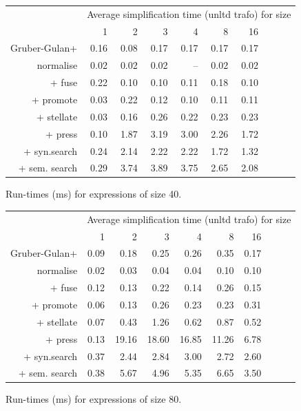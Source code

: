 \begin{figure}\begin{tabular}{rrrrrrrrrr}
 & \multicolumn{9}{c}{Average simplification time (unltd trafo) for size} \\
 & 1 & 2 & 3 & 4 & 8 & 16 \\
Gruber-Gulan+ & 0.16 & 0.08 & 0.17 & 0.17 & 0.17 & 0.17 \\
normalise & 0.02 & 0.02 & 0.02 & -- & 0.02 & 0.02 \\
+ fuse & 0.22 & 0.10 & 0.10 & 0.11 & 0.18 & 0.10 \\
+ promote & 0.03 & 0.22 & 0.12 & 0.10 & 0.11 & 0.11 \\
+ stellate & 0.03 & 0.16 & 0.26 & 0.22 & 0.23 & 0.23 \\
+ press & 0.10 & 1.87 & 3.19 & 3.00 & 2.26 & 1.72 \\
+ syn.search & 0.24 & 2.14 & 2.22 & 2.22 & 1.72 & 1.32 \\
+ sem. search & 0.29 & 3.74 & 3.89 & 3.75 & 2.65 & 2.08 \\
\end{tabular}\caption{Run-times (ms) for expressions of size 40.}\end{figure}
\begin{figure}\begin{tabular}{rrrrrrrrrr}
 & \multicolumn{9}{c}{Average simplification time (unltd trafo) for size} \\
 & 1 & 2 & 3 & 4 & 8 & 16 \\
Gruber-Gulan+ & 0.09 & 0.18 & 0.25 & 0.26 & 0.35 & 0.17 \\
normalise & 0.02 & 0.03 & 0.04 & 0.04 & 0.10 & 0.10 \\
+ fuse & 0.12 & 0.13 & 0.22 & 0.14 & 0.26 & 0.15 \\
+ promote & 0.06 & 0.13 & 0.26 & 0.23 & 0.23 & 0.31 \\
+ stellate & 0.07 & 0.43 & 1.26 & 0.62 & 0.87 & 0.52 \\
+ press & 0.13 & 19.16 & 18.60 & 16.85 & 11.26 & 6.78 \\
+ syn.search & 0.37 & 2.44 & 2.84 & 3.00 & 2.72 & 2.60 \\
+ sem. search & 0.38 & 5.67 & 4.96 & 5.35 & 6.65 & 3.50 \\
\end{tabular}\caption{Run-times (ms) for expressions of size 80.}\end{figure}
